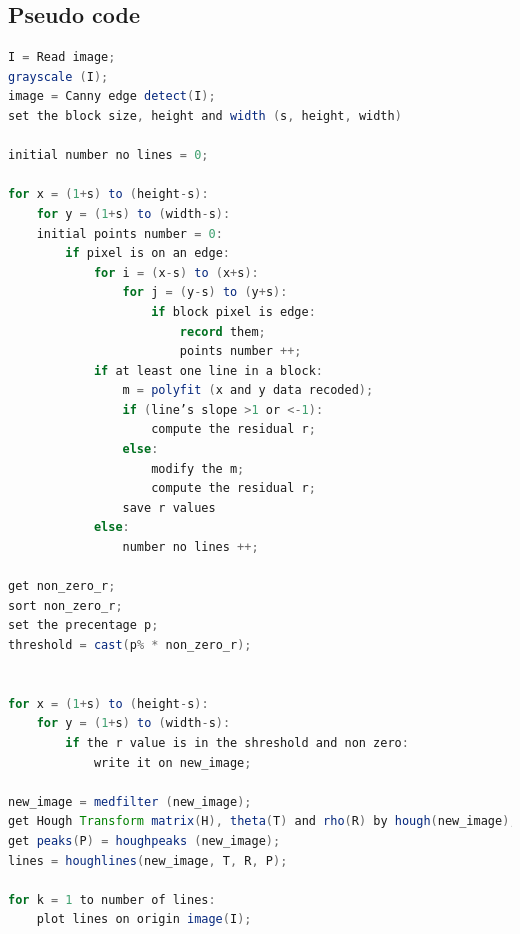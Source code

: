 \subsection{Pseudo code}
\begin{lstlisting}[language=Java]
I = Read image;
grayscale (I);
image = Canny edge detect(I);
set the block size, height and width (s, height, width)
	
initial number no lines = 0;

for x = (1+s) to (height-s):
    for y = (1+s) to (width-s):
    initial points number = 0:
        if pixel is on an edge:
            for i = (x-s) to (x+s):
                for j = (y-s) to (y+s):
        	        if block pixel is edge:
                        record them;
                        points number ++;
        	if at least one line in a block:
        	    m = polyfit (x and y data recoded);
        	    if (line’s slope >1 or <-1):
        	        compute the residual r;
        	    else:
        	        modify the m;
        	        compute the residual r;
        	    save r values
        	else:
                number no lines ++;
                
get non_zero_r;
sort non_zero_r;	
set the precentage p;
threshold = cast(p% * non_zero_r);


for x = (1+s) to (height-s):
    for y = (1+s) to (width-s):
        if the r value is in the shreshold and non zero:
	        write it on new_image;
	        
new_image = medfilter (new_image);
get Hough Transform matrix(H), theta(T) and rho(R) by hough(new_image);
get peaks(P) = houghpeaks (new_image);
lines = houghlines(new_image, T, R, P);

for k = 1 to number of lines:
    plot lines on origin image(I);

\end{lstlisting}